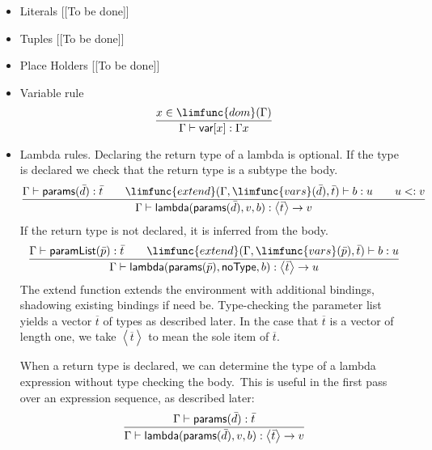 \documentclass[12pt]{article}
\begin{document}
\begin{itemize}
\item Literals [[To be done]]

\item Tuples [[To be done]]

\item Place Holders [[To be done]]

\item Variable rule%
\begin{equation*}
\frac{x\in \limfunc{dom}(\Gamma )}{\Gamma \vdash \mathsf{var}[x]:\Gamma x}
\end{equation*}

\item Lambda rules. Declaring the return type of a lambda is optional. If
the type is declared we check that the return type is a subtype the body.%
\begin{equation*}
\frac{\Gamma \vdash \mathsf{params}(\bar{d}):\bar{t}\qquad \limfunc{extend}%
(\Gamma ,\limfunc{vars}(\bar{d}),\bar{t})\vdash b:u\qquad u<:v}{\Gamma
\vdash \mathsf{lambda}(\mathsf{params}(\bar{d}),v,b):\left\langle \bar{t}%
\right\rangle \rightarrow v}
\end{equation*}%
If the return type is not declared, it is inferred from the body.%
\begin{equation*}
\frac{\Gamma \vdash \mathsf{paramList}(\bar{p}):\bar{t}\qquad \limfunc{extend%
}(\Gamma ,\limfunc{vars}(\bar{p}),\bar{t})\vdash b:u}{\Gamma \vdash \mathsf{%
lambda}(\mathsf{params}(\bar{p}),\mathsf{noType},b):\left\langle \bar{t}%
\right\rangle \rightarrow u}
\end{equation*}%
The extend function extends the environment with additional bindings,
shadowing existing bindings if need be. Type-checking the parameter list
yields a vector $\overline{t}$ of types as described later. In the case that 
$\overline{t}$ is a vector of length one, we take $\left\langle \overline{t}%
\right\rangle $ to mean the sole item of $\overline{t}$.

When a return type is declared, we can determine the type of a lambda
expression without type checking the body.\ This is useful in the first pass
over an expression sequence, as described later:%
\begin{equation*}
\frac{\Gamma \vdash \mathsf{params}(\bar{d}):\bar{t}}{\Gamma \vdash \mathsf{%
lambda}(\mathsf{params}(\bar{d}),v,b):\left\langle \bar{t}\right\rangle
\rightarrow v}
\end{equation*}


\end{itemize}
\end{document}

